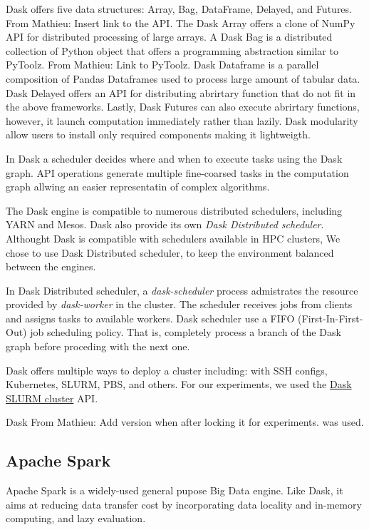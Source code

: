 \documentclass[conference]{IEEEtran}
\newcommand{\MD}[1]{\color{magenta}From Mathieu: #1 \color{black}}
\begin{document}
Dask offers five data structures: Array, Bag, DataFrame, Delayed, and Futures. \MD{Insert link to the API.}
The Dask Array offers a clone of NumPy API for distributed processing of large arrays.
A Dask Bag is a distributed collection of Python object that offers a programming abstraction similar to PyToolz. \MD{Link to PyToolz.}
Dask Dataframe is a parallel composition of Pandas Dataframes used to process large amount of tabular data.
Dask Delayed offers an API for distributing abrirtary function that do not fit in the above frameworks.
Lastly, Dask Futures can also execute abrirtary functions, however, it launch computation immediately rather than lazily.
Dask modularity allow users to install only required components making it lightweigth.

In Dask a scheduler decides where and when to execute tasks using the Dask graph.
API operations generate multiple fine-coarsed tasks in the computation graph allwing an easier representatin of complex algorithms.

The Dask engine is compatible to numerous distributed schedulers, including YARN and Mesos.
Dask also provide its own \textit{Dask Distributed scheduler}.
Althought Dask is compatible with schedulers available in HPC clusters,
We chose to use Dask Distributed scheduler, to keep the environment balanced between the engines.

In Dask Distributed scheduler, a \textit{dask-scheduler} process admistrates the resource provided by \textit{dask-worker} in the cluster.
The scheduler receives jobs from clients and assigns tasks to available workers.
Dask scheduler use a FIFO (First-In-First-Out) job scheduling policy.
That is, completely process a branch of the Dask graph before proceding with the next one.

Dask offers multiple ways to deploy a cluster including: with SSH configs, Kubernetes, SLURM, PBS, and others.
For our experiments, we used the \href{https://jobqueue.dask.org/en/latest/generated/dask_jobqueue.SLURMCluster.html}{Dask SLURM cluster} API.

Dask \MD{Add version when after locking it for experiments.} was used.

\subsection{Apache Spark}
Apache Spark is a widely-used general pupose Big Data engine.
Like Dask, it aims at reducing data transfer cost by incorporating data locality and in-memory computing, and lazy evaluation.
\end{document}
